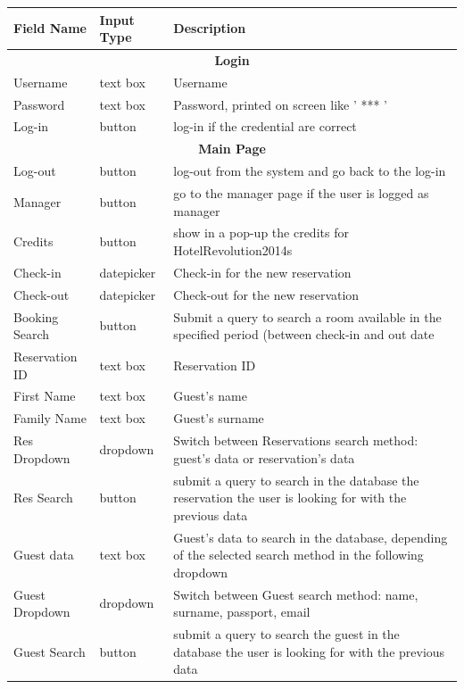 \begin{center}
	\begin{longtable}{| l | l | p{7cm} |}
	\hline
	\textbf{Field Name} & \textbf{Input Type} & \textbf{Description} \\ 
	\hline \hline	
	\multicolumn{3}{|c|}{\textbf{Login}} \\ 
	\hline \hline
	Username 		& text box 		& Username \\ 
	Password 		& text box 		& Password, printed on screen like ' *** ' \\
	Log-in			& button 		& log-in if the credential are correct \\ 
	\hline \hline
	\multicolumn{3}{|c|}{\textbf{Main Page}} \\ 
	\hline \hline
	Log-out			& button		& log-out from the system and go back to the log-in \\
	Manager			& button		& go to the manager page if the user is logged as manager \\
	Credits			& button		& show in a pop-up the credits for HotelRevolution2014s \\
	\hline
	Check-in		& datepicker 	& Check-in for the new reservation \\ 
	Check-out		& datepicker 	& Check-out for the new reservation \\ 
	Booking Search	& button		& Submit a query to search a room available in the specified period (between check-in and out date \\
	\hline
	Reservation ID	& text box 		& Reservation ID \\ 
	First Name 		& text box	 	& Guest's name \\ 
	Family Name	 	& text box 		& Guest's surname \\ 
	Res Dropdown 	& dropdown 		& Switch between Reservations search method: guest's data or reservation's data \\ 
	Res Search		& button		& submit a query to search in the database the reservation the user is looking for with the previous data \\
	\hline
	Guest data		& text box		& Guest's data to search in the database, depending of the selected search method in the following dropdown \\ 
	Guest Dropdown	& dropdown 		& Switch between Guest search method: name, surname, passport, email \\ 
	Guest Search	& button		& submit a query to search the guest in the database the user is looking for with the previous data \\

\end{longtable}
\end{center}
